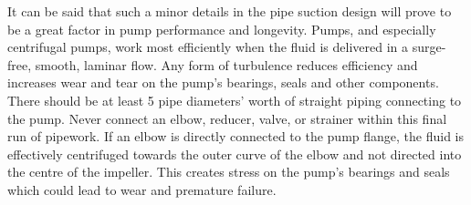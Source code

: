 It can be said that such a minor details in the pipe suction design will prove to be a great factor in pump performance and longevity. Pumps, and especially centrifugal pumps, work most efficiently when the fluid is delivered in a  surge-free, smooth, laminar flow. Any form of turbulence reduces efficiency and increases wear and tear on the pump’s bearings, seals and other components. There should be at least 5 pipe diameters’ worth of straight piping connecting to the pump. Never connect an elbow, reducer, valve, or strainer within this final run of pipework. If an elbow is directly connected to the pump flange, the fluid is effectively centrifuged towards the outer curve of  the elbow and not directed into the centre of the impeller. This creates stress on the pump’s bearings and seals which could lead to wear and premature failure.









